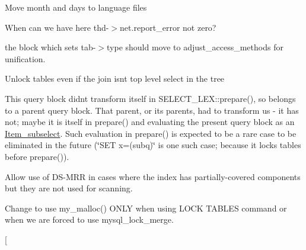 \begin{DoxyRefList}
\item[\label{todo__todo000041}%
\Hypertarget{todo__todo000041}%
File \mbox{\hyperlink{item__timefunc_8cc}{item\+\_\+timefunc.cc}} ]Move month and days to language files  
\item[\label{todo__todo000080}%
\Hypertarget{todo__todo000080}%
Member \mbox{\hyperlink{group__Query__Executor_ga31581f58624b85919d7c6cd632157929}{J\+O\+IN\+:\+:exec}} ()]When can we have here thd-\/$>$net.\+report\+\_\+error not zero? 
\item[\label{todo__todo000095}%
\Hypertarget{todo__todo000095}%
Member \mbox{\hyperlink{group__Query__Optimizer_gae9c1cf0874f4bda777557d012148e059}{J\+O\+IN\+:\+:get\+\_\+best\+\_\+combination}} ()]the block which sets tab-\/$>$type should move to adjust\+\_\+access\+\_\+methods for unification.  
\item[\label{todo__todo000119}%
\Hypertarget{todo__todo000119}%
Member \mbox{\hyperlink{group__Query__Optimizer_gaa62d47da29f3853e87b1069ee5c1ff21}{J\+O\+IN\+:\+:join\+\_\+free}} ()]Unlock tables even if the join isn\textquotesingle{}t top level select in the tree  
\item[\label{todo__todo000091}%
\Hypertarget{todo__todo000091}%
Member \mbox{\hyperlink{group__Query__Optimizer_ga7f722315c64ce97cff639d705107c660}{J\+O\+IN\+:\+:optimize}} ()]This query block didn\textquotesingle{}t transform itself in S\+E\+L\+E\+C\+T\+\_\+\+L\+E\+X\+::prepare(), so belongs to a parent query block. That parent, or its parents, had to transform us -\/ it has not; maybe it is itself in prepare() and evaluating the present query block as an \mbox{\hyperlink{classItem__subselect}{Item\+\_\+subselect}}. Such evaluation in prepare() is expected to be a rare case to be eliminated in the future (\char`\"{}\+S\+E\+T x=(subq)\char`\"{} is one such case; because it locks tables before prepare()).  
\item[\label{todo__todo000023}%
\Hypertarget{todo__todo000023}%
Member \mbox{\hyperlink{handler_8cc_a136dfdf479102e63c8ddf02af552c445}{key\+\_\+uses\+\_\+partial\+\_\+cols}} (\mbox{\hyperlink{structTABLE}{T\+A\+B\+LE}} $\ast$table, uint keyno)]Allow use of DS-\/M\+RR in cases where the index has partially-\/covered components but they are not used for scanning. 
\item[\label{todo__todo000043}%
\Hypertarget{todo__todo000043}%
File \mbox{\hyperlink{lock_8cc}{lock.cc}} ]Change to use my\+\_\+malloc() O\+N\+LY when using L\+O\+CK T\+A\+B\+L\+ES command or when we are forced to use mysql\+\_\+lock\+\_\+merge.  
\item[\label{todo__todo000044}%

\end{DoxyRefList}
